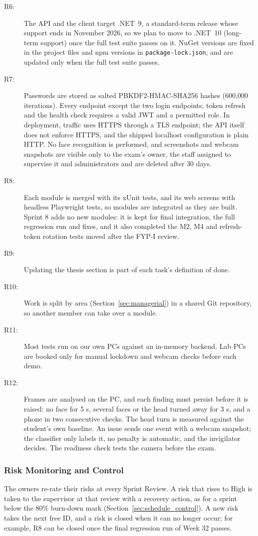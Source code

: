\begin{description}
    \item[R6:] The API and the client target .NET~9, a standard-term release whose support ends in November 2026, so we plan to move to .NET~10 (long-term support) once the full test suite passes on it. NuGet versions are fixed in the project files and npm versions in \texttt{package-lock.json}, and are updated only when the full test suite passes.
    \item[R7:] Passwords are stored as salted PBKDF2-HMAC-SHA256 hashes (600,000 iterations). Every endpoint except the two login endpoints, token refresh and the health check requires a valid JWT and a permitted role. In deployment, traffic uses HTTPS through a TLS endpoint; the API itself does not enforce HTTPS, and the shipped localhost configuration is plain HTTP. No face recognition is performed, and screenshots and webcam snapshots are visible only to the exam's owner, the staff assigned to supervise it and administrators and are deleted after 30 days.
    \item[R8:] Each module is merged with its xUnit tests, and its web screens with headless Playwright tests, so modules are integrated as they are built. Sprint 8 adds no new modules: it is kept for final integration, the full regression run and fixes, and it also completed the M2, M4 and refresh-token rotation tests moved after the FYP-I review.
    \item[R9:] Updating the thesis section is part of each task's definition of done.
    \item[R10:] Work is split by area (Section~\ref{sec:managerial}) in a shared Git repository, so another member can take over a module.
    \item[R11:] Most tests run on our own PCs against an in-memory backend. Lab PCs are booked only for manual lockdown and webcam checks before each demo.
    \item[R12:] Frames are analysed on the PC, and each finding must persist before it is raised: no face for 5 s, several faces or the head turned away for 3 s, and a phone in two consecutive checks. The head turn is measured against the student's own baseline. An issue sends one event with a webcam snapshot; the classifier only labels it, no penalty is automatic, and the invigilator decides. The readiness check tests the camera before the exam.
\end{description}

\subsubsection{Risk Monitoring and Control}

The owners re-rate their risks at every Sprint Review. A risk that rises to High is taken to the supervisor at that review with a recovery action, as for a sprint below the 80\% burn-down mark (Section~\ref{sec:schedule_control}). A new risk takes the next free ID, and a risk is closed when it can no longer occur; for example, R8 can be closed once the final regression run of Week 32 passes.
